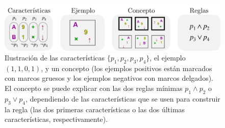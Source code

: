 \begin{figure}
\begin{center}
	\includegraphics[scale=.6]{../figuras/brm/intro_notation_sp.pdf}
\end{center}\caption{Ilustración de las características $\{p_1,p_2,p_3,p_4\}$, el ejemplo $(1,1,0,1)$, y un concepto (los ejemplos positivos están marcados con marcos gruesos y los ejemplos negativos con marcos delgados). El concepto se puede explicar con las dos reglas mínimas $p_1 \land p_2$ o $ p_3 \lor p_4$, dependiendo de las características que se usen para construir la regla (las dos primeras características o las dos últimas características, respectivamente).}
\label{fig:intro_notation}
\end{figure}



